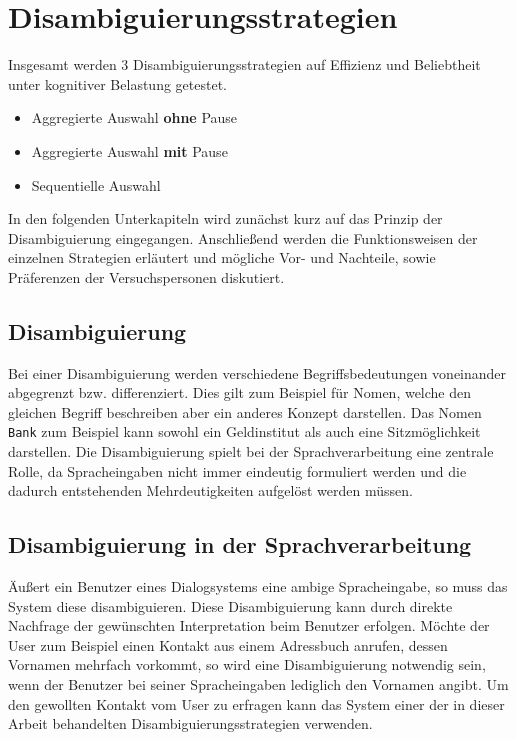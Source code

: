 \documentclass[12pt,a4paper]{scrartcl}
\begin{document}
\section{Disambiguierungsstrategien}
\label{disambiguierungsstrategien}
Insgesamt werden 3 Disambiguierungsstrategien auf Effizienz und Beliebtheit unter kognitiver Belastung getestet.
\begin{itemize}
\item Aggregierte Auswahl \textbf{ohne} Pause
\item Aggregierte Auswahl \textbf{mit} Pause
\item Sequentielle Auswahl
\end{itemize}
In den folgenden Unterkapiteln wird zunächst kurz auf das Prinzip der Disambiguierung eingegangen. Anschließend werden die Funktionsweisen der einzelnen Strategien erläutert und mögliche Vor- und Nachteile, sowie Präferenzen der Versuchspersonen diskutiert.


\subsection{Disambiguierung}
Bei einer Disambiguierung werden verschiedene Begriffsbedeutungen voneinander abgegrenzt bzw. differenziert. Dies gilt zum Beispiel für Nomen, welche den gleichen Begriff beschreiben aber ein anderes Konzept darstellen. Das Nomen \texttt{Bank} zum Beispiel kann sowohl ein Geldinstitut als auch eine Sitzmöglichkeit darstellen. Die Disambiguierung spielt bei der Sprachverarbeitung eine zentrale Rolle, da Spracheingaben nicht immer eindeutig formuliert werden und die dadurch entstehenden Mehrdeutigkeiten aufgelöst werden müssen. 
\subsection{Disambiguierung in der Sprachverarbeitung}
Äußert ein Benutzer eines Dialogsystems eine ambige Spracheingabe, so muss das System diese disambiguieren. Diese Disambiguierung kann durch direkte Nachfrage der gewünschten Interpretation beim Benutzer erfolgen. 
Möchte der User zum Beispiel einen Kontakt aus einem Adressbuch anrufen, dessen Vornamen mehrfach vorkommt, so wird eine Disambiguierung notwendig sein, wenn der Benutzer bei seiner Spracheingaben lediglich den Vornamen angibt. Um den gewollten Kontakt vom User zu erfragen kann das System einer der in dieser Arbeit behandelten Disambiguierungsstrategien verwenden. 
\end{document}
